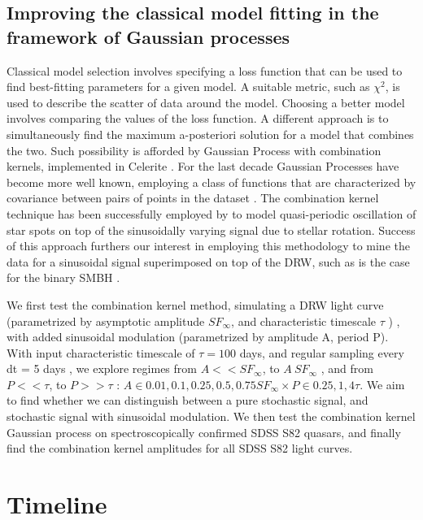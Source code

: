 \documentclass[modern]{aastex62}
\begin{document}
\subsection{Improving the classical model fitting in the  framework of Gaussian processes}

Classical model selection involves specifying a loss function that can be used to find best-fitting parameters for a given model. A suitable metric, such as $\chi^{2}$, is used to  describe the scatter of data around the model. Choosing a better model involves comparing the values of the loss function. A different approach is to simultaneously find the maximum a-posteriori solution for a model that combines the two. Such possibility is afforded by Gaussian Process with combination kernels,  implemented in Celerite  \citep{foreman2017}. For the last decade Gaussian Processes have become more well known, employing a class of functions that  are characterized by covariance between pairs of points in the dataset \citep{foreman2017}.  The combination kernel technique has been successfully employed by  \cite{angus2018}  to model  quasi-periodic oscillation of star spots on top of the sinusoidally varying signal due to stellar rotation. Success of this approach furthers our interest in employing this methodology to mine the data for a sinusoidal signal superimposed on top of the DRW, such as is the case for the binary SMBH \citep{charisi2018}. 

We first test the combination kernel method, simulating a DRW light curve (parametrized by asymptotic amplitude $SF_{\infty}$, and characteristic timescale $\tau$ ) , with  added sinusoidal modulation (parametrized by amplitude A, period P). With input characteristic timescale of $\tau  = 100 $ days, and regular sampling every dt = 5 days  , we explore regimes from $A << SF_{\infty}$,  to $A ~ SF_{\infty}$ , and from $P << \tau$, to $P >> \tau$ :  $A \in { 0.01,  0.1,  0.25,  0.5, 0.75 } SF_{\infty}  \times  P \in { 0.25,  1 ,  4 } \tau  $. We aim to find whether we can distinguish between a pure stochastic signal, and stochastic signal with sinusoidal modulation. We then test the combination kernel Gaussian process on spectroscopically confirmed SDSS S82 quasars, and finally find  the combination kernel amplitudes for all SDSS S82 light curves.


\section{Timeline}




\end{document}
